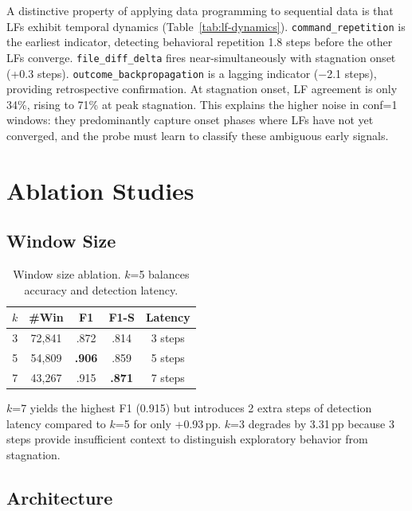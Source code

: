 \documentclass[11pt,a4paper]{article}
\begin{document}
A distinctive property of applying data programming to sequential data is that LFs exhibit temporal dynamics (Table~\ref{tab:lf-dynamics}).
\texttt{command\_repetition} is the earliest indicator, detecting behavioral repetition 1.8 steps before the other LFs converge.
\texttt{file\_diff\_delta} fires near-simultaneously with stagnation onset (+0.3 steps).
\texttt{outcome\_backpropagation} is a lagging indicator ($-$2.1 steps), providing retrospective confirmation.
At stagnation onset, LF agreement is only 34\%, rising to 71\% at peak stagnation.
This explains the higher noise in conf=1 windows: they predominantly capture onset phases where LFs have not yet converged, and the probe must learn to classify these ambiguous early signals.

\section{Ablation Studies}
\label{sec:ablations}

\subsection{Window Size}

\begin{table}[t]
\centering
\small
\begin{tabular}{ccccc}
\toprule
\textbf{$k$} & \textbf{\#Win} & \textbf{F1} & \textbf{F1-S} & \textbf{Latency} \\
\midrule
3 & 72,841 & .872 & .814 & 3 steps \\
5 & 54,809 & \textbf{.906} & .859 & 5 steps \\
7 & 43,267 & .915 & \textbf{.871} & 7 steps \\
\bottomrule
\end{tabular}
\caption{Window size ablation. $k$=5 balances accuracy and detection latency.}
\label{tab:window-size}
\end{table}

$k$=7 yields the highest F1 (0.915) but introduces 2 extra steps of detection latency compared to $k$=5 for only +0.93\,pp.
$k$=3 degrades by 3.31\,pp because 3 steps provide insufficient context to distinguish exploratory behavior from stagnation.

\subsection{Architecture}
\end{document}
